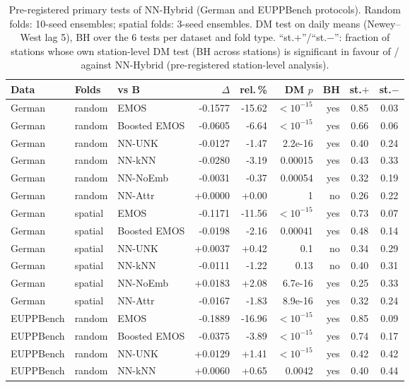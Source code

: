 \begin{table}[!htbp]
\centering
\caption{Pre-registered primary tests of NN-Hybrid (German and EUPPBench protocols). Random folds: 10-seed ensembles; spatial folds: 3-seed ensembles. DM test on daily means (Newey--West lag 5), BH over the 6 tests per dataset and fold type. ``st.$+$''/``st.$-$'': fraction of stations whose own station-level DM test (BH across stations) is significant in favour of / against NN-Hybrid (pre-registered station-level analysis).}
\label{tab:primary}
\scriptsize
\setlength{\tabcolsep}{4pt}
\begin{tabular}{lllrrrrcc}
\toprule
Data & Folds & vs B & $\Delta$ & rel.\,\% & DM $p$ & BH & st.$+$ & st.$-$ \\
\midrule
German & random & EMOS & -0.1577 & -15.62 & $<10^{-15}$ & yes & 0.85 & 0.03 \\
German & random & Boosted EMOS & -0.0605 & -6.64 & $<10^{-15}$ & yes & 0.66 & 0.06 \\
German & random & NN-UNK & -0.0127 & -1.47 & 2.2e-16 & yes & 0.40 & 0.24 \\
German & random & NN-kNN & -0.0280 & -3.19 & 0.00015 & yes & 0.43 & 0.33 \\
German & random & NN-NoEmb & -0.0031 & -0.37 & 0.00054 & yes & 0.32 & 0.19 \\
German & random & NN-Attr & +0.0000 & +0.00 & 1 & no & 0.26 & 0.22 \\
\addlinespace
German & spatial & EMOS & -0.1171 & -11.56 & $<10^{-15}$ & yes & 0.73 & 0.07 \\
German & spatial & Boosted EMOS & -0.0198 & -2.16 & 0.00041 & yes & 0.48 & 0.14 \\
German & spatial & NN-UNK & +0.0037 & +0.42 & 0.1 & no & 0.34 & 0.29 \\
German & spatial & NN-kNN & -0.0111 & -1.22 & 0.13 & no & 0.40 & 0.31 \\
German & spatial & NN-NoEmb & +0.0183 & +2.08 & 6.7e-16 & yes & 0.25 & 0.33 \\
German & spatial & NN-Attr & -0.0167 & -1.83 & 8.9e-16 & yes & 0.32 & 0.24 \\
\addlinespace
EUPPBench & random & EMOS & -0.1889 & -16.96 & $<10^{-15}$ & yes & 0.85 & 0.09 \\
EUPPBench & random & Boosted EMOS & -0.0375 & -3.89 & $<10^{-15}$ & yes & 0.74 & 0.17 \\
EUPPBench & random & NN-UNK & +0.0129 & +1.41 & $<10^{-15}$ & yes & 0.42 & 0.42 \\
EUPPBench & random & NN-kNN & +0.0060 & +0.65 & 0.0042 & yes & 0.40 & 0.44 \\

\end{tabular}
\end{table}
